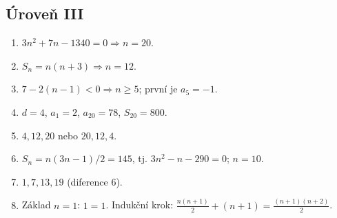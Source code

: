 \documentclass[11pt,a4paper]{article}
\begin{document}
\subsection*{Úroveň III}
\begin{enumerate}[label=\textbf{III.\arabic*}]
\item $3n^2+7n-1340=0\Rightarrow n=20$.
\item $S_n=n(n+3)\Rightarrow n=12$.
\item $7-2(n-1)<0\Rightarrow n\ge5$; první je $a_5=-1$.
\item $d=4$, $a_1=2$, $a_{20}=78$, $S_{20}=800$.
\item $4,12,20$ nebo $20,12,4$.
\item $S_n=n(3n-1)/2=145$, tj. $3n^2-n-290=0$; $n=10$.
\item $1,7,13,19$ (diference $6$).
\item Základ $n=1$: $1=1$. Indukční krok: $\frac{n(n+1)}2+(n+1)=\frac{(n+1)(n+2)}2$.
\end{enumerate}
\fi
\end{document}
